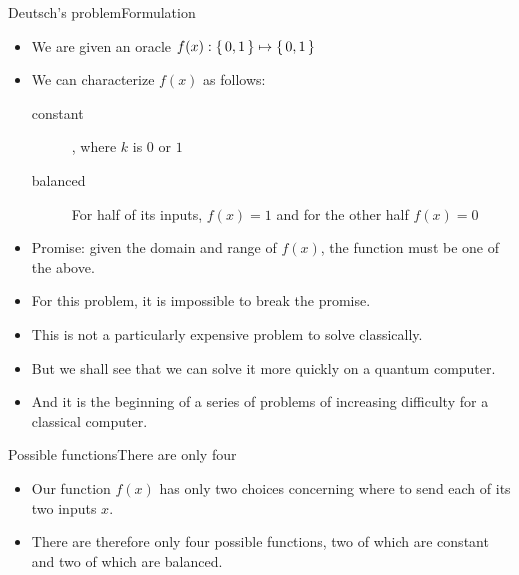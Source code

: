 
\begin{frame}{Deutsch's problem}{Formulation}

\begin{itemize}[<+->]
    \item We are given an oracle $f(x): \left\{\,0,1\,\right\} \mapsto \left\{\,0,1\,\right\}$
    \item We can characterize $f(x)$ as follows:
    \begin{description}
        \item[constant]   , where $k$ is $0$ or $1$
        \item[balanced]   For half of its inputs, $f(x)=1$ and for the other half $f(x)=0$
    \end{description}
    \item Promise: given the domain and range of $f(x)$, the function must be one of the above.
    \item For this problem, it is impossible to break the promise.
    \item This is not a particularly expensive problem to solve classically.
    \item But we shall see that we can solve it more quickly on a quantum computer.
    \item And it is the beginning of a series of problems of increasing difficulty for a classical computer.
\end{itemize}
    
\end{frame}

\begin{frame}{Possible functions}{There are only four}

\begin{itemize}
    \item Our function $f(x)$ has only two choices concerning where to send each of its two inputs $x$.  
    \item There are therefore only four possible  functions, two of which are \alert{constant} and two of which are \alert{balanced}.
\end{itemize}
\Vskip{-4em}
    
\end{frame}

